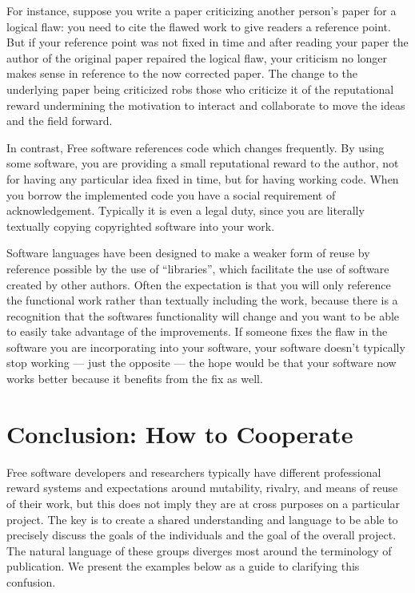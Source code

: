 \documentclass[
	fontsize=10pt, %
	twoside=false, %
	secnumdepth=1, %
]{kaobook}
\begin{document}
For instance, suppose you write a paper criticizing another person’s
paper for a logical flaw: you need to cite the flawed work to give
readers a reference point. But if your reference point was not fixed
in time and after reading your paper the author of the original paper
repaired the logical flaw, your criticism no longer makes sense in
reference to the now corrected paper. The change to the underlying
paper being criticized robs those who criticize it of the reputational
reward undermining the motivation to interact and collaborate to move
the ideas and the field forward.

In contrast, Free software references code which changes
frequently. By using some software, you are providing a small
reputational reward to the author, not for having any particular idea
fixed in time, but for having working code. When you borrow the
implemented code you have a social requirement of
acknowledgement. Typically it is even a legal duty, since you are
literally textually copying copyrighted software into your work.

Software languages have been designed to make a weaker form of reuse
by reference possible by the use of “libraries”, which facilitate the
use of software created by other authors. Often the expectation is
that you will only reference the functional work rather than textually
including the work, because there is a recognition that the softwares
functionality will change and you want to be able to easily take
advantage of the improvements. If someone fixes the flaw in the
software you are incorporating into your software, your software
doesn’t typically stop working — just the opposite — the hope would be
that your software now works better because it benefits from the fix
as well.

\section{Conclusion: How to Cooperate}
Free software developers and researchers typically have different
professional reward systems and expectations around mutability,
rivalry, and means of reuse of their work, but this does not imply
they are at cross purposes on a particular project. The key is to
create a shared understanding and language to be able to precisely
discuss the goals of the individuals and the goal of the overall
project. The natural language of these groups diverges most around the
terminology of publication. We present the examples below as a guide
to clarifying this confusion.
\end{document}
